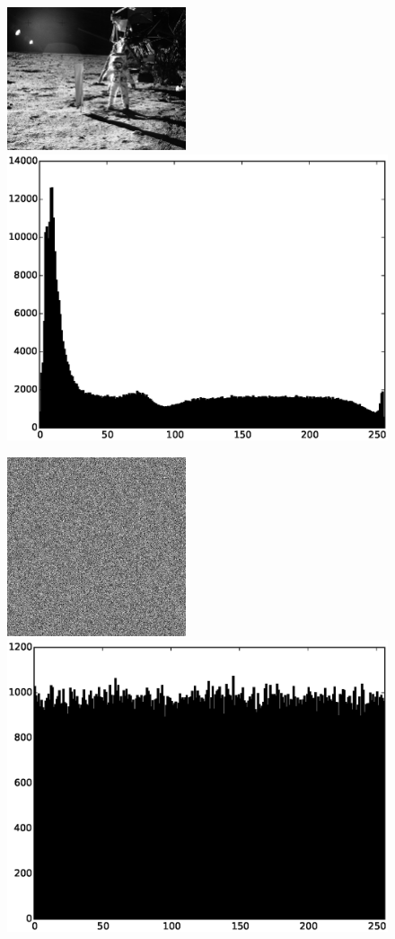 \documentclass[xcolor=table,presentation]{beamer}    %
\begin{document}
\begin{frame}{\insertsubsection}
\begin{figure}[T]
  \centering
  \includegraphics[width=0.470\textwidth]{bilder/moon.jpg}
  \hfill
  \includegraphics[width=0.520\linewidth]{bilder/moon_hist.eps}
\end{figure}
\end{frame}

\begin{frame}{\insertsubsection}
\begin{figure}[T]
  \centering
  \includegraphics[width=0.470\textwidth]{bilder/uniformnoise.png}
  \hfill
  \includegraphics[width=0.520\linewidth]{bilder/uniformnoise_hist.eps}
\end{figure}
\end{frame}
\end{document}
